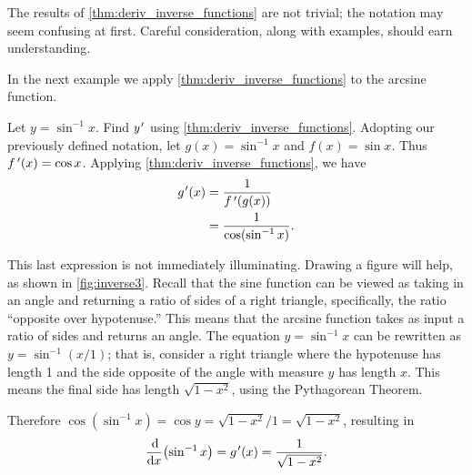The results of \autoref{thm:deriv_inverse_functions} are not trivial; the notation may seem confusing at first. Careful consideration, along with examples, should earn understanding.


In the next example we apply \autoref{thm:deriv_inverse_functions} to the arcsine function.

\begin{example}\label{ex_deriv_arcsin}%
Let $y = \sin^{-1} x$. Find $y\primeskip'$ using \autoref{thm:deriv_inverse_functions}.
\solution
Adopting our previously defined notation, let $g(x) = \sin^{-1} x$ and $f(x) = \sin x$. Thus $f\,'(x) = \cos x$. Applying \autoref{thm:deriv_inverse_functions}, we have 
\begin{align*}
	g\primeskip'(x) &= \frac{1}{\fp(g(x))} \\
	&= \frac{1}{\cos(\sin^{-1}x)}.
\end{align*}
			

This last expression is not immediately illuminating. Drawing a figure will help, as shown in \autoref{fig:inverse3}. Recall that the sine function can be viewed as taking in an angle and returning a ratio of sides of a right triangle, specifically, the ratio ``opposite over hypotenuse.'' This means that the arcsine function takes as input a ratio of sides and returns an angle. The equation $y=\sin^{-1} x$ can be rewritten as $y=\sin^{-1}(x/1)$; that is, consider a right triangle where the hypotenuse has length 1 and the side opposite of the angle with measure $y$ has length $x$. This means the final side has length $\sqrt{1-x^2}$, using the Pythagorean Theorem.

Therefore $\cos (\sin^{-1} x) = \cos y = \sqrt{1-x^2}/1 = \sqrt{1-x^2}$, resulting in
\[\frac \dd{\dd x}\bigl(\sin^{-1}x\bigr)=g\primeskip'(x)=\frac1{\sqrt{1-x^2}}.\]
\end{example}

